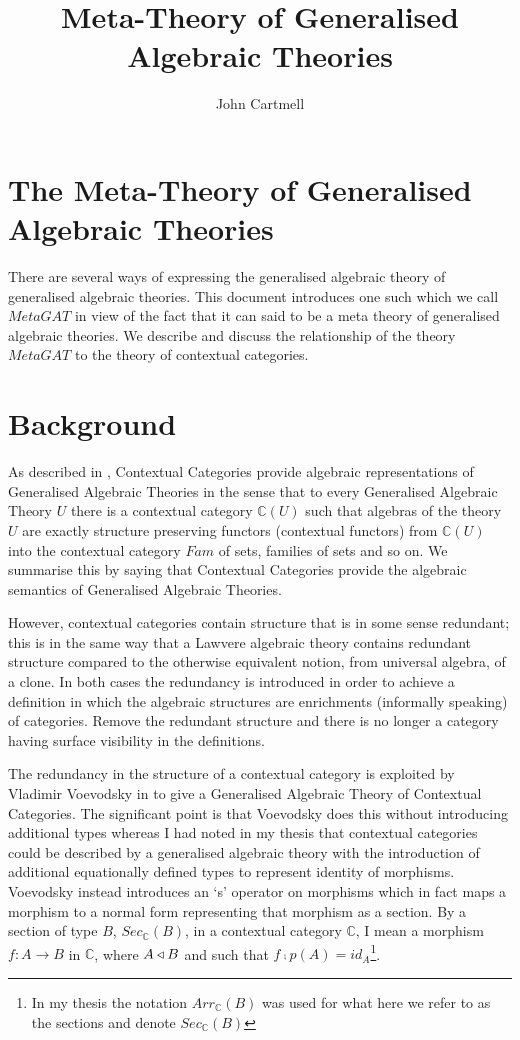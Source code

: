 \documentclass[10pt,a4paper]{article}
\title{Meta-Theory of Generalised Algebraic Theories}
\author{John Cartmell}
\begin{document}
\maketitle

\section{The Meta-Theory of Generalised Algebraic Theories}
There are several ways of expressing the generalised algebraic 
theory of generalised algebraic theories.  This document introduces one such  
which we call $MetaGAT$ in view of the fact that it can said to be a meta theory of generalised algebraic theories. We describe and discuss the relationship of the theory $MetaGAT$ to the theory of contextual categories.  

\section{Background}
As described in \cite{Cartmell86}, Contextual Categories provide algebraic representations of Generalised Algebraic Theories  in the sense that to every Generalised Algebraic Theory $U$ there is a contextual category $\mathbb{C}(U)$ such that algebras of the theory $U$ are exactly structure preserving functors (contextual functors)  from $\mathbb{C}(U)$ into the contextual category $Fam$ of sets, families of sets and so on. We summarise this by saying that Contextual Categories provide the algebraic semantics of Generalised Algebraic Theories. 

However, contextual categories contain structure that is in some sense redundant; this is in the same way that a Lawvere algebraic theory contains redundant structure compared to the otherwise equivalent notion, from universal algebra, of a clone. In both cases the redundancy is introduced in order to achieve a definition in which the algebraic structures 
 are enrichments (informally speaking) of categories. Remove the redundant structure and there is no longer a category having surface visibility in the definitions. 

The redundancy in the structure of a contextual category is exploited by Vladimir Voevodsky in \cite{Voevodsky14C} to give a Generalised Algebraic Theory of Contextual Categories. The significant point is that Voevodsky does this without introducing additional types whereas I had noted in my thesis \cite{Cartmell78} that contextual categories could be described by a generalised algebraic theory with the introduction of additional equationally defined types to represent identity of morphisms. Voevodsky instead introduces an  `s' operator on morphisms which in fact maps a morphism to a normal form representing that morphism as a section. By a section of type $B$, $Sec_{\mathbb{C}}(B)$, in a contextual category $\mathbb{C}$, I mean a morphism $f:A\rightarrow B$ in $\mathbb{C}$, where 
$A \triangleleft B$ and such that $f \comp p(A) = id_A$\footnote{In my thesis the notation $Arr_{\mathbb{C}}(B)$ was used for what here we refer to as the sections and denote $Sec_{\mathbb{C}}(B)$}.
\end{document}
